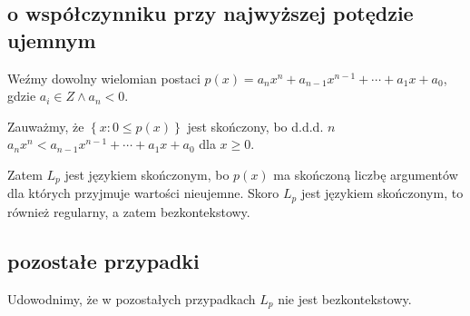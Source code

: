 \documentclass{article}
\theoremstyle{definition}
\theoremstyle{remark}
\begin{document}
\subsection{o współczynniku przy najwyższej potędzie ujemnym}

Weźmy dowolny wielomian postaci \( p(x)=a_n x^n + a_{n-1}x^{n-1} + \cdots + a_1x + a_0\), gdzie \(a_i \in Z \land a_n < 0\).

Zauważmy, że \(\left\{ x: 0 \leq p(x) \right\}\) jest skończony, bo d.d.d. \(n\) \(a_n x^n < a_{n-1}x^{n-1} + \cdots + a_1x + a_0\) dla \(x \geq 0\).

Zatem \(L_p\) jest językiem skończonym, bo \(p(x)\) ma skończoną liczbę argumentów
dla których przyjmuje wartości nieujemne.
Skoro \(L_p\) jest językiem skończonym, to również regularny, a zatem bezkontekstowy.

\subsection{pozostałe przypadki}\label{sec:a:remaining}

Udowodnimy, że w pozostałych przypadkach \(L_p\) nie jest bezkontekstowy.
\end{document}
